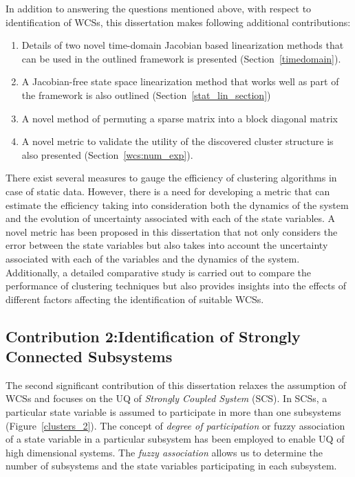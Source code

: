 In addition to answering the questions mentioned above, with respect to identification of WCSs, this dissertation makes following additional contributions:
\begin{enumerate}
\item Details of two novel time-domain Jacobian based linearization methods that can be used in the outlined framework is presented (Section~\ref{timedomain}).
\item A Jacobian-free state space linearization method that works well as part of the framework is also outlined (Section~\ref{stat_lin_section})
\item A novel method of permuting a sparse matrix into a block diagonal matrix %
\item A novel metric to validate the utility of the discovered cluster structure is also presented (Section~\ref{wcs:num_exp}).
\end{enumerate}
There exist several measures to gauge the efficiency of clustering algorithms in case of static data. However, there is a need for developing a metric that can estimate the efficiency taking into consideration both the dynamics of the system and the evolution of uncertainty associated with each of the state variables. A novel metric has been proposed in this dissertation that not only considers the error between the state variables but also takes into account the uncertainty associated with each of the variables and the dynamics of the system. Additionally, a detailed comparative study is carried out to compare the performance of clustering techniques but also provides insights into the effects of different factors affecting the identification of suitable WCSs.

\subsection{Contribution 2:Identification of Strongly Connected Subsystems}


The second significant contribution of this dissertation relaxes the assumption of WCSs and focuses on the UQ of \textit{Strongly Coupled System} (SCS). In SCSs, a particular state variable is assumed to participate in more than one subsystems (Figure~\ref{clusters_2}). The concept of \textit{degree of participation} or fuzzy association of a state variable in a particular subsystem has been employed to enable UQ of high dimensional systems. The \textit{fuzzy association} allows us to determine the number of subsystems and the state variables participating in each subsystem. 


